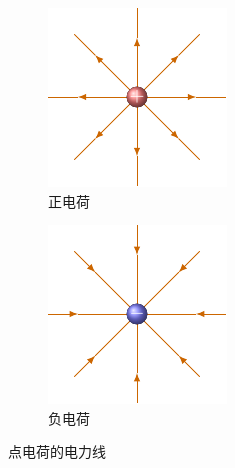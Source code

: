 \begin{figure}[htbp]
    \centering
    \begin{subfigure}{0.4\linewidth}
        \centering
        \includegraphics{fig/B/6-9a.pdf}
        \caption{正电荷}\label{fig_B_6-9a}
    \end{subfigure}
    \hfil
    \begin{subfigure}{0.4\linewidth}
        \centering
        \includegraphics{fig/B/6-9b.pdf}
        \caption{负电荷}\label{fig_B_6-9b}
    \end{subfigure}
    \caption{点电荷的电力线}\label{fig_B_6-9}
\end{figure}
    

